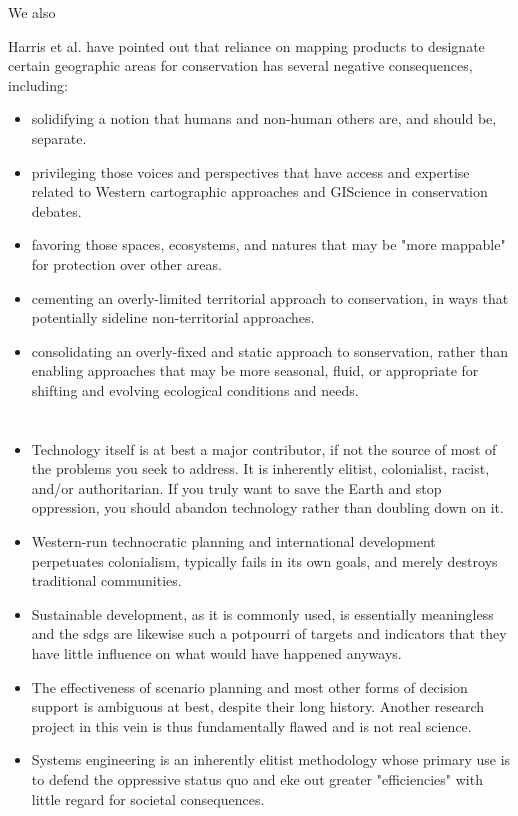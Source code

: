We also 

Harris et al. have pointed out that reliance on mapping products to designate certain geographic areas for conservation has several negative consequences, including: 

\begin{itemize}
    \setlength{\itemsep}{0pt}%
    \setlength{\parskip}{0pt}%
	\item{solidifying a notion that humans and non-human others are, and should be, separate.}
	\item{privileging those voices and perspectives that have access and expertise related to Western cartographic approaches and GIScience in conservation debates.}
	\item{favoring those spaces, ecosystems, and natures that may be "more mappable" for protection over other areas.}
	\item{cementing an overly-limited territorial approach to conservation, in ways that potentially sideline non-territorial approaches.}
	\item{consolidating an overly-fixed and static approach to sonservation, rather than enabling approaches that may be more seasonal, fluid, or appropriate for shifting and evolving ecological conditions and needs.}
\end{itemize}

\section{}

\begin{itemize} \setlength{\itemsep}{0pt} \setlength{\parskip}{0pt} 
	\item{Technology itself is at best a major contributor, if not the source of most of the problems you seek to address. It is inherently elitist, colonialist, racist, and/or authoritarian. If you truly want to save the Earth and stop oppression, you should abandon technology rather than doubling down on it.}	
	\item{Western-run technocratic planning and international development perpetuates colonialism, typically fails in its own goals, and merely destroys traditional communities.}
	\item{Sustainable development, as it is commonly used, is essentially meaningless and the \acp{sdg} are likewise such a potpourri of targets and indicators that they have little influence on what would have happened anyways.}
	\item{The effectiveness of scenario planning and most other forms of decision support is ambiguous at best, despite their long history. Another research project in this vein is thus fundamentally flawed and is not real science.}	
	\item{Systems engineering is an inherently elitist methodology whose primary use is to defend the oppressive status quo and eke out greater "efficiencies" with little regard for societal consequences.}
\end{itemize}



